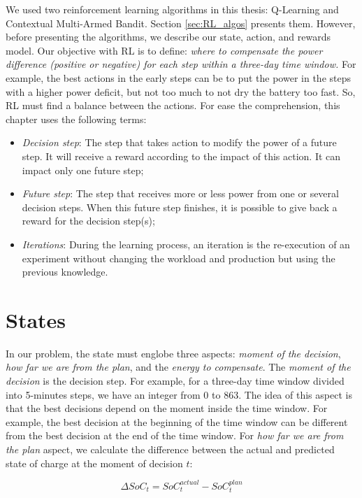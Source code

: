 We used two reinforcement learning algorithms in this thesis: Q-Learning and Contextual Multi-Armed Bandit. Section \ref{sec:RL_algos} presents them. However, before presenting the algorithms, we describe our state, action, and rewards model. Our objective with RL is to define: \textit{where to compensate the power difference (positive or negative) for each step within a three-day time window.} For example, the best actions in the early steps can be to put the power in the steps with a higher power deficit, but not too much to not dry the battery too fast. So, RL must find a balance between the actions. For ease the comprehension, this chapter uses the following terms:
\begin{itemize}
    \item \textit{Decision step}: The step that takes action to modify the power of a future step. It will receive a reward according to the impact of this action. It can impact only one future step;
    \item \textit{Future step}: The step that receives more or less power from one or several decision steps. When this future step finishes, it is possible to give back a reward for the decision step(s);
    \item \textit{Iterations}: During the learning process, an iteration is the re-execution of an experiment without changing the workload and production but using the previous knowledge.
\end{itemize}

\section{States}

In our problem, the state must englobe three aspects: \textit{moment of the decision}, \textit{how far we are from the plan}, and the \textit{energy to compensate}. The \textit{moment of the decision} is the decision step. For example, for a three-day time window divided into 5-minutes steps, we have an integer from 0 to 863. The idea of this aspect is that the best decisions depend on the moment inside the time window. For example, the best decision at the beginning of the time window can be different from the best decision at the end of the time window. For \textit{how far we are from the plan} aspect, we calculate the difference between the actual and predicted state of charge at the moment of decision $t$:

\begin{equation}
    \Delta SoC_t = SoC^{actual}_{t} - SoC^{plan}_{t}
\end{equation}

